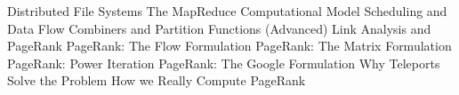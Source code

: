 Distributed File Systems  
The MapReduce Computational Model  
Scheduling and Data Flow  
Combiners and Partition Functions (Advanced)  
Link Analysis and PageRank  
PageRank: The Flow Formulation  
PageRank: The Matrix Formulation 
PageRank: Power Iteration  
PageRank: The Google Formulation  
Why Teleports Solve the Problem  
How we Really Compute PageRank  

